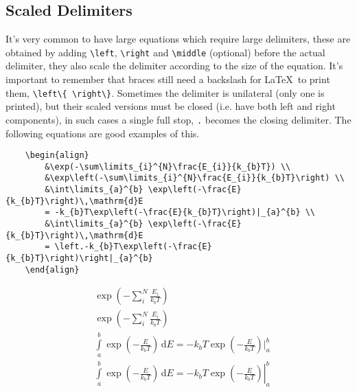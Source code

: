 \subsection{Scaled Delimiters}
%
It's very common to have large equations which require large
delimiters, these are obtained by adding \verb|\left|, \verb|\right|
and \verb|\middle| (optional) before the actual delimiter, they also
scale the delimiter according to the size of the equation.  It's
important to remember that braces still need a backslash for \LaTeX~to
print them, \verb|\left\{ \right\}|.  Sometimes the delimiter is
unilateral (only one is printed), but their scaled versions must be
closed (i.e. have both left and right components), in such cases a
single full stop, \verb|.| becomes the closing delimiter. The
following equations are good examples of this.
\begin{verbatim}
	\begin{align}
	    &\exp(-\sum\limits_{i}^{N}\frac{E_{i}}{k_{b}T}) \\
	    &\exp\left(-\sum\limits_{i}^{N}\frac{E_{i}}{k_{b}T}\right) \\
	    &\int\limits_{a}^{b} \exp\left(-\frac{E}{k_{b}T}\right)\,\mathrm{d}E
	    = -k_{b}T\exp\left(-\frac{E}{k_{b}T}\right)|_{a}^{b} \\
	    &\int\limits_{a}^{b} \exp\left(-\frac{E}{k_{b}T}\right)\,\mathrm{d}E
	    = \left.-k_{b}T\exp\left(-\frac{E}{k_{b}T}\right)\right|_{a}^{b}
	\end{align}
\end{verbatim}
\begin{align}
    &\exp(-\sum\limits_{i}^{N}\frac{E_{i}}{k_{b}T}) \\
    &\exp\left(-\sum\limits_{i}^{N}\frac{E_{i}}{k_{b}T}\right) \\
    &\int\limits_{a}^{b} \exp\left(-\frac{E}{k_{b}T}\right)\,\mathrm{d}E
    = -k_{b}T\exp\left(-\frac{E}{k_{b}T}\right)|_{a}^{b} \\
    &\int\limits_{a}^{b} \exp\left(-\frac{E}{k_{b}T}\right)\,\mathrm{d}E = \left.-k_{b}T\exp\left(-\frac{E}{k_{b}T}\right)\right|_{a}^{b}
\end{align}
%
